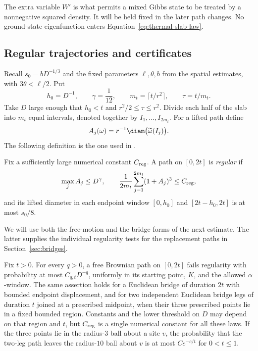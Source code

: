 The extra variable $W'$ is what permits a mixed Gibbs state to be
treated by a nonnegative squared density.  It will be held fixed
in the later path changes.  No ground-state eigenfunction enters
Equation~\eqref{eq:thermal-slab-law}.

\subsection{Regular trajectories and certificates}

Recall $s_0=bD^{-1/3}$ and the fixed parameters
$\ell,\theta,b$ from the spatial estimates, with
$3\theta<\ell/2$.  Put
\begin{equation}\label{eq:regularity-scales}
 h_0=D^{-1},\qquad \gamma=\frac1{12},\qquad
 m_t=\lceil t/r^2\rceil,\qquad \tau=t/m_t.
\end{equation}
Take $D$ large enough that $h_0<t$ and
$r^2/2\le\tau\le r^2$.  Divide each half of the slab into
$m_t$ equal intervals, denoted together by $I_1,\ldots,I_{2m_t}$.
For a lifted path define
\[
 A_j(\omega)=r^{-1}\diam\bigl(\widetilde\omega(I_j)\bigr).
\]
The following definition is the one used in
\citet[Section ``A stationary sample of hard-core paths,''
definition of a regular path]{HS}.

\begin{definition}\label{def:regular}
Fix a sufficiently large numerical constant $C_{\rm reg}$.
A path on $[0,2t]$ is \emph{regular} if
\begin{equation}\label{eq:regularity-tests}
 \max_j A_j\le D^\gamma,
 \qquad
 \frac1{2m_t}\sum_{j=1}^{2m_t}(1+A_j)^3\le C_{\rm reg},
\end{equation}
and its lifted diameter in each endpoint window
$[0,h_0]$ and $[2t-h_0,2t]$ is at most $s_0/8$.
\end{definition}

We will use both the free-motion and the bridge forms of the next
estimate.  The latter supplies the individual regularity tests
for the replacement paths in Section~\ref{sec:bridges}.

\begin{lemma}\label{lem:free-cutoffs}
Fix $t>0$.  For every $q>0$, a free Brownian path on $[0,2t]$
fails regularity with probability at most $C_{q,t}D^{-q}$,
uniformly in its starting point, $K$, and the allowed
$\alpha$-window.  The same assertion holds for a Euclidean
bridge of duration $2t$ with bounded endpoint displacement, and
for two independent Euclidean bridge legs of duration $t$
joined at a prescribed midpoint, when their three prescribed
points lie in a fixed bounded region.  Constants and the lower
threshold on $D$ may depend on that region and $t$, but
$C_{\rm reg}$ is a single numerical constant for all these laws.
If the three points lie in the radius-$3$ ball about a site $v$,
the probability that the two-leg path leaves the radius-$10$
ball about $v$ is at most $Ce^{-c/t}$ for $0<t\le1$.
\end{lemma}


